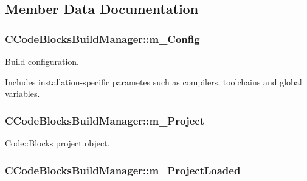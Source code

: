\subsection{Member Data Documentation}
\hypertarget{classCCodeBlocksBuildManager_abda268cd01673d4a1fec14a73c4f8914}{
\subsubsection[{m\-\_\-\-Config}]{\setlength{\rightskip}{0pt plus 5cm}C\-Code\-Blocks\-Build\-Manager\-::m\-\_\-\-Config\hspace{0.3cm}{\ttfamily [private]}}}\label{classCCodeBlocksBuildManager_abda268cd01673d4a1fec14a73c4f8914}


Build configuration. 

Includes installation-\/specific parametes such as compilers, toolchains and global variables. \hypertarget{classCCodeBlocksBuildManager_a70ffda777a7fda5cd18a1a97ad7871b7}{
\subsubsection[{m\-\_\-\-Project}]{\setlength{\rightskip}{0pt plus 5cm}C\-Code\-Blocks\-Build\-Manager\-::m\-\_\-\-Project\hspace{0.3cm}{\ttfamily [private]}}}\label{classCCodeBlocksBuildManager_a70ffda777a7fda5cd18a1a97ad7871b7}


Code\-::\-Blocks project object. 

\hypertarget{classCCodeBlocksBuildManager_a347f43f610f53350c6721b3613bfa68b}{
\subsubsection[{m\-\_\-\-Project\-Loaded}]{\setlength{\rightskip}{0pt plus 5cm}C\-Code\-Blocks\-Build\-Manager\-::m\-\_\-\-Project\-Loaded\hspace{0.3cm}{\ttfamily [private]}}}\label{classCCodeBlocksBuildManager_a347f43f610f53350c6721b3613bfa68b}


